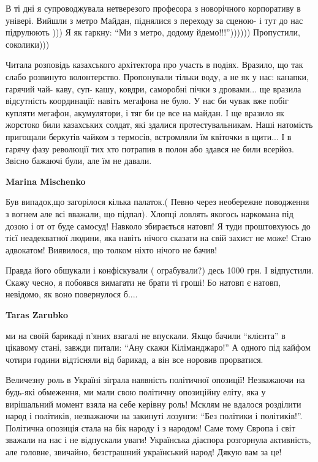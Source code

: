 \begin{itemize}
\begin{itemize}
\begin{itemize}
В ті дні я супроводжувала нетверезого професора з новорічного корпоративу в
універі. Вийшли з метро Майдан, піднялися з переходу за сценою- і тут до нас
підрулюють ))) Я як гаркну: \enquote{Ми з метро, додому йдемо!!!})))))) Пропустили,
соколики)))



Читала розповідь казахського архітектора про участь в подіях. Вразило, що так
слабо розвинуто волонтерство. Пропонували тільки воду, а не як у нас: канапки,
гарячий чай- каву, суп- кашу, ковдри, саморобні пічки з дровами... ще вразила
відсутність координації: навіть мегафона не було. У нас би чувак вже побіг
купляти мегафон, акумулятори, і тяг би це все на майдан. І ще вразило як
жорстоко били казахських солдат, які здалися протестувальникам. Наші натомість
пригощали беркутів чайком з термосів, встромляли їм квіточки в щити... І в
гарячу фазу революції тих хто потрапив в полон або здався не били всерйоз.
Звісно бажаючі були, але їм не давали.

\textbf{Marina Mischenko} 

Був випадок,що загорілося кілька палаток.( Певно через необережне поводження з
вогнем але всі вважали, що підпал). Хлопці ловлять якогось наркомана під дозою
і от от буде самосуд! Навколо збирається натовп! Я туди проштовхуюсь до тієї
неадекватної людини, яка навіть нічого сказати на свій захист не може! Стаю
адвокатом! Виявилося, що толком ніхто нічого не бачив!

Правда його обшукали і конфіскували ( ограбували?) десь 1000 грн. І відпустили.
Скажу чесно, я побоявся вимагати не брати ті гроші! Бо натовп є натовп,
невідомо, як воно повернулося б....


\textbf{Taras Zarubko} 

ми на своїй барикаді п'яних взагалі не впускали. Якщо бачили \enquote{клієнта} в
цікавому стані, завжди питали: \enquote{Ану скажи Кіліманджаро!} А одного під кайфом
чотири години відтісняли від барикад, а він все норовив прорватися.

\end{itemize} %


Величезну роль в Україні зіграла наявність політичної опозиції! Незважаючи на
будь-які обмеження, ми мали свою політичну опозиційну еліту, яка у вирішальний
момент взяла на себе керівну роль! Мсклям не вдалося розділити народ і
політиків, незважаючи на закинуті лозунги: \enquote{Без політики і політиків!}.
Політична опозиція стала на бік народу і з народом! Саме тому Європа і світ
зважали на нас і не відпускали уваги! Українська діаспора розгорнула
активність, але головне, звичайно, безстрашний український народ! Дякую вам за
це!



\end{itemize}
\end{itemize}
